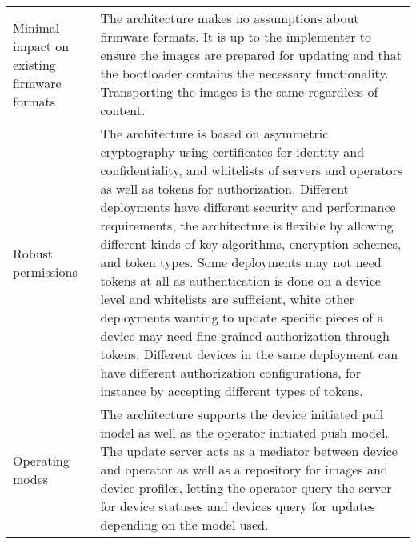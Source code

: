 \begin{longtable}[]{@{}ll@{}}
\begin{minipage}[t]{0.41\columnwidth}\raggedright\strut
Minimal impact on existing firmware formats\strut
\end{minipage} & \begin{minipage}[t]{0.53\columnwidth}\raggedright\strut
The architecture makes no assumptions about firmware formats. It is up
to the implementer to ensure the images are prepared for updating and
that the bootloader contains the necessary functionality. Transporting
the images is the same regardless of content.\strut
\end{minipage}\tabularnewline
\begin{minipage}[t]{0.41\columnwidth}\raggedright\strut
Robust permissions\strut
\end{minipage} & \begin{minipage}[t]{0.53\columnwidth}\raggedright\strut
The architecture is based on asymmetric cryptography using certificates
for identity and confidentiality, and whitelists of servers and
operators as well as tokens for authorization. Different deployments
have different security and performance requirements, the architecture
is flexible by allowing different kinds of key algorithms, encryption
schemes, and token types. Some deployments may not need tokens at all as
authentication is done on a device level and whitelists are sufficient,
white other deployments wanting to update specific pieces of a device
may need fine-grained authorization through tokens. Different devices in
the same deployment can have different authorization configurations, for
instance by accepting different types of tokens.\strut
\end{minipage}\tabularnewline
\begin{minipage}[t]{0.41\columnwidth}\raggedright\strut
Operating modes\strut
\end{minipage} & \begin{minipage}[t]{0.53\columnwidth}\raggedright\strut
The architecture supports the device initiated pull model as well as the
operator initiated push model. The update server acts as a mediator
between device and operator as well as a repository for images and
device profiles, letting the operator query the server for device
statuses and devices query for updates depending on the model
used.\strut
\end{minipage}\tabularnewline
\bottomrule
\end{longtable}


